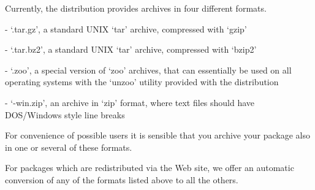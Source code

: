 Currently, the {\GAP} distribution provides archives in four different
formats.
\beginlist
\item{-} `.tar.gz', a standard UNIX  `tar' archive, compressed with `gzip'
\item{-} `.tar.bz2', a standard UNIX  `tar' archive, compressed with `bzip2'
\item{-} `.zoo', a special version of `zoo' archives, that can essentially
be used on all operating systems with the `unzoo' utility provided with
the {\GAP} distribution
\item{-} `-win.zip', an archive in `zip' format, where text files should
have DOS/Windows style line breaks
\endlist

For convenience of possible users it is sensible that you archive your
package also in one or several of these formats.

For packages which are redistributed via the {\GAP} Web site, we offer
an automatic conversion of any of  the formats listed above to all the
others.



